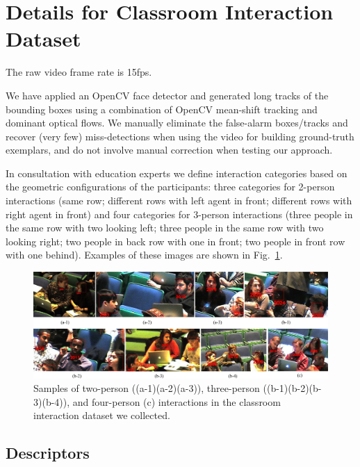 \documentclass[10pt,twocolumn,letterpaper]{article}
\begin{document}
\section{Details for Classroom Interaction Dataset}

The raw video frame rate is 15fps.

We have applied an OpenCV face detector and generated long tracks of the bounding boxes using a combination of OpenCV mean-shift tracking and dominant optical flows. We manually eliminate the false-alarm boxes/tracks and recover (very few) miss-detections when using the video for building ground-truth exemplars, and do not involve manual correction when testing our approach. 


In consultation with education experts we define interaction categories based on the geometric configurations of the participants: three categories for 2-person interactions (same row; different rows with left agent in front; different rows with right agent in front) and four categories for 3-person interactions (three people in the same row with two looking left; three people in the same row with two looking right; two people in back row with one in front; two people in front row with one behind). Examples of these images are shown in Fig.~\ref{dataset}.
\begin{figure}[h]
\begin{center}
\includegraphics[scale=1.2]{dataset.png}
\end{center}
\caption{Samples of two-person ((a-1)(a-2)(a-3)), three-person ((b-1)(b-2)(b-3)(b-4)), and four-person (c) interactions in the classroom interaction dataset we collected.}
\label{dataset}
\end{figure}


\subsection{Descriptors}
\end{document}
